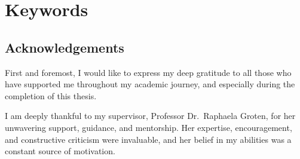 %
\chapter*{Keywords}\label{cha:keywords}
\thiskeywords%

\begin{figure}[!h]
    \begin{center}
    \end{center}
\end{figure}

%
\section*{Acknowledgements}\label{cha:acknowledgements}
First and foremost, I would like to express my deep gratitude to all those who have supported me throughout my academic journey, and especially during the completion of this thesis.

I am deeply thankful to my supervisor, Professor Dr.\ Raphaela Groten, for her unwavering support, guidance, and mentorship. Her expertise, encouragement, and constructive criticism were invaluable, and her belief in my abilities was a constant source of motivation.

